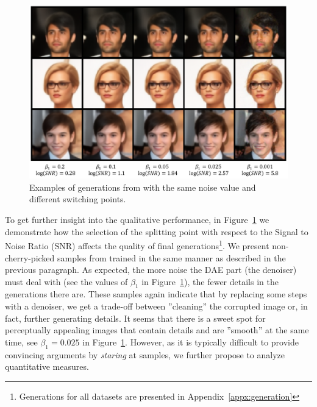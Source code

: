 \begin{figure}
    \begin{adjustbox}{center}
    \includegraphics[width=0.8\linewidth]{pics/4_daed/experiments/daed_generations.png}
    \end{adjustbox}
    \caption{Examples of generations from \ours{} with the same noise value and different switching points.}
    \label{fig:daed_generations} 
\vspace*{\baselineskip}
    \end{figure}

To get further insight into the qualitative performance, in Figure~\ref{fig:daed_generations} we demonstrate how the selection of the splitting point with respect to the Signal to Noise Ratio (SNR) affects the quality of final generations\footnote{Generations for all datasets are presented in Appendix~\ref{appx:generation}}. We present non-cherry-picked samples from \ours{} trained in the same manner as described in the previous paragraph. As expected, the more noise the DAE part (the denoiser) must deal with (see the values of $\beta_1$ in Figure~\ref{fig:daed_generations}), the fewer details in the generations there are. These samples again indicate that by replacing some steps with a denoiser, we get a trade-off between ''cleaning'' the corrupted image or, in fact, further generating details. It seems that there is a sweet spot for perceptually appealing images that contain details and are ''smooth'' at the same time, see $\beta_1=0.025$ in Figure~\ref{fig:daed_generations}. However, as it is typically difficult to provide convincing arguments by \textit{staring} at samples, we further propose to analyze quantitative measures.

